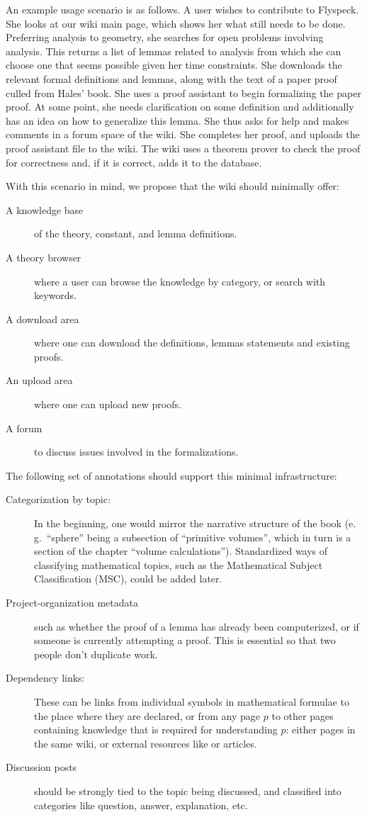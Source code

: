 An example usage scenario is as follows. A user wishes to contribute to
Flyspeck.  She looks at our wiki main page, which shows her what still needs to
be done.  Preferring analysis to geometry, she searches for open problems
involving analysis.  This returns a list of lemmas related to analysis from
which she can choose one that seems possible given her time constraints. She
downloads the relevant formal definitions and lemmas, along with the text of a
paper proof culled from Hales' book.  She uses a proof assistant to begin
formalizing the paper proof.  At some point, she needs
clarification on some definition and additionally has an idea on how to
generalize this lemma.  She thus asks for help and makes comments in a forum
space of the wiki.  She completes her proof, and uploads the proof assistant
file to the wiki.  The wiki uses a theorem prover to check the proof for
correctness and, if it is correct, adds it to the database.

With this scenario in mind, we propose that the wiki should minimally offer: 
\begin{description}
\item[A knowledge base] of the theory, constant, and lemma definitions.
\item[A theory browser] where a user can browse the knowledge by category, or search with keywords.
\item[A download area] where one can download the definitions, lemmas statements and existing proofs.
\item[An upload area] where one can upload new proofs.
\item[A forum] to discuss issues involved in the formalizations.
\end{description}

The following set of annotations should support this minimal infrastructure:

\begin{description}
\item[Categorization by topic:] In the beginning, one would mirror the narrative structure
  of the book (e.\,g.\ ``sphere'' being a subsection of ``primitive volumes'', which in turn
  is a section of the chapter ``volume calculations'').  Standardized ways of classifying
  mathematical topics, such as the Mathematical Subject Classification
  (MSC)\cite{AMS:MSC2000}, could be added later.
\item[Project-organization metadata] such as whether the proof
  of a lemma has already been computerized, or if someone is currently 
  attempting a proof.  This is essential so that two people don't duplicate
  work.
\item[Dependency links:] These can be links from individual symbols in
  mathematical formulae to the place where they are declared, or from
  any page $p$ to other pages containing knowledge that is required
  for understanding $p$: either pages in the same wiki, or external
  resources like  or  articles.
\item[Discussion posts] should be strongly tied to the topic being
  discussed, and classified into categories like question, answer,
  explanation, etc.
\end{description}

